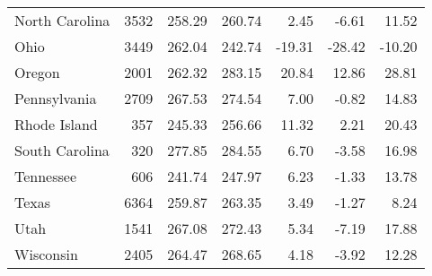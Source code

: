 \begin{table}[ht]
\begin{center}
\begin{tabular}{lrrrrrr}
  North Carolina & 3532 & 258.29 & 260.74 & 2.45 & -6.61 & 11.52 \\ 
  Ohio & 3449 & 262.04 & 242.74 & -19.31 & -28.42 & -10.20 \\ 
  Oregon & 2001 & 262.32 & 283.15 & 20.84 & 12.86 & 28.81 \\ 
  Pennsylvania & 2709 & 267.53 & 274.54 & 7.00 & -0.82 & 14.83 \\ 
  Rhode Island & 357 & 245.33 & 256.66 & 11.32 & 2.21 & 20.43 \\ 
  South Carolina & 320 & 277.85 & 284.55 & 6.70 & -3.58 & 16.98 \\ 
  Tennessee & 606 & 241.74 & 247.97 & 6.23 & -1.33 & 13.78 \\ 
  Texas & 6364 & 259.87 & 263.35 & 3.49 & -1.27 & 8.24 \\ 
  Utah & 1541 & 267.08 & 272.43 & 5.34 & -7.19 & 17.88 \\ 
  Wisconsin & 2405 & 264.47 & 268.65 & 4.18 & -3.92 & 12.28 \\ 
   \hline
\end{tabular}
\end{center}
\end{table}

